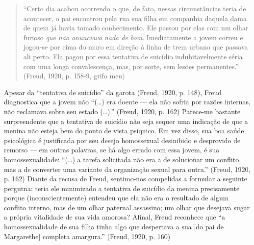\begin{quote}
``Certo dia acabou ocorrendo o que, de fato, nessas circunstâncias teria
de acontecer, o pai encontrou pela rua sua filha em companhia daquela
dama de quem já havia tomado conhecimento. Ele passou por elas com um
olhar furioso \emph{que não anunciava nada de bom}. Imediatamente a
jovem correu e jogou-se por cima do muro em direção à linha de trem
urbano que passava ali perto. Ela pagou por essa tentativa de suicídio
indubitavelmente séria com uma longa convalescença, mas, por sorte, sem
lesões permanentes.'' (Freud, 1920, p. 158-9, grifo meu)
\end{quote}

Apesar da ``tentativa de suicídio'' da garota (Freud, 1920, p. 148),
Freud diagnostica que a jovem não ``(\ldots{}) era doente --- ela não
sofria por razões internas, não reclamava sobre seu estado (\ldots{}).''
(Freud, 1920, p. 162) Parece-me bastante surpreendente que a tentativa
de suicídio não seja sequer uma indicação de que a menina não esteja bem
do ponto de vista psíquico. Em vez disso, sua boa saúde psicológica é
justificada por seu desejo homossexual desinibido e desprovido de
remorso --- em outras palavras, se há algo errado com essa jovem, é sua
homossexualidade: ``(\ldots{}) a tarefa solicitada não era a de
solucionar um conflito, mas a de converter uma variante da organização
sexual para outra.'' (Freud, 1920, p. 162) Diante da recusa de Freud,
sentimo-nos compelidas a formular a seguinte pergutna: teria ele
minimizado a tentativa de suicídio da menina precisamente porque
(inconscientemente) entendeu que ela não era o resultado de algum
conflito interno, mas de um olhar paternal assassino; um olhar que
desejava sugar a própria vitalidade de sua vida amorosa? Afinal, Freud
reconhece que ``a homossexualidade de sua filha tinha algo que
despertava a sua {[}do pai de Margarethe{]} completa amargura.'' (Freud,
1920, p. 160)

